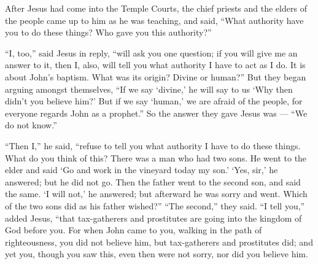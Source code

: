  After Jesus had come into the Temple Courts, the chief
priests and the elders of the people came up to him as he was teaching,
and said, ``What authority have you to do these things? Who gave you
this authority?''

 ``I, too,'' said Jesus in reply, ``will ask you one
question; if you will give me an answer to it, then I, also, will tell
you what authority I have to act as I do.  It is about
John's baptism. What was its origin? Divine or human?'' But they began
arguing amongst themselves, ``If we say `divine,' he will say to us `Why
then didn't you believe him?'  But if we say `human,' we
are afraid of the people, for everyone regards John as a prophet.''
 So the answer they gave Jesus was --- ``We do not know.''

``Then I,'' he said, ``refuse to tell you what authority I have to do
these things.  What do you think of this? There was a man
who had two sons. He went to the elder and said `Go and work in the
vineyard today my son.'  `Yes, sir,' he answered; but he
did not go.  Then the father went to the second son, and
said the same. `I will not,' he answered; but afterward he was sorry and
went.  Which of the two sons did as his father wished?''
``The second,'' they said. ``I tell you,'' added Jesus, ``that
tax-gatherers and prostitutes are going into the kingdom of God before
you.  For when John came to you, walking in the path of
righteousness, you did not believe him, but tax-gatherers and
prostitutes did; and yet you, though you saw this, even then were not
sorry, nor did you believe him.

